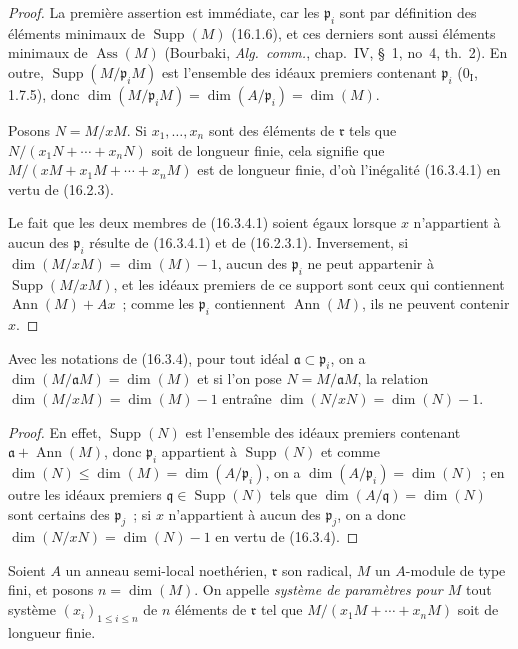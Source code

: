 \begin{proof}
La première assertion est immédiate, car les $\mathfrak{p}_i$ sont par
définition des éléments minimaux de $\operatorname{Supp}(M)$ (16.1.6), et ces
derniers sont aussi éléments minimaux de $\operatorname{Ass}(M)$ (Bourbaki,
\emph{Alg.~comm.}, chap.~IV, \S~1, no~4, th.~2). En outre,
$\operatorname{Supp}(M/\mathfrak{p}_iM)$ est l'ensemble des idéaux premiers
contenant $\mathfrak{p}_i$ ($0_{\mathrm I}$, 1.7.5), donc
$\dim(M/\mathfrak{p}_iM)=\dim(A/\mathfrak{p}_i)=\dim(M)$.

Posons $N=M/xM$. Si $x_1,\ldots,x_n$ sont des éléments de $\mathfrak{r}$ tels
que $N/(x_1N+\cdots+x_nN)$ soit de longueur finie, cela signifie que
$M/(xM+x_1M+\cdots+x_nM)$ est de longueur finie, d'où l'inégalité (16.3.4.1)
en vertu de (16.2.3).

Le fait que les deux membres de (16.3.4.1) soient égaux lorsque $x$
n'appartient à aucun des $\mathfrak{p}_i$ résulte de (16.3.4.1) et de
(16.2.3.1). Inversement, si
$\dim(M/xM)=\dim(M)-1$, aucun des $\mathfrak{p}_i$ ne peut appartenir à
$\operatorname{Supp}(M/xM)$, et les idéaux premiers de ce support sont ceux
qui contiennent $\operatorname{Ann}(M)+Ax$~; comme les $\mathfrak{p}_i$
contiennent $\operatorname{Ann}(M)$, ils ne peuvent contenir $x$.
\end{proof}

\begin{corollary}[16.3.5]
\label{0.16.3.5-fr}
Avec les notations de (16.3.4), pour tout idéal
$\mathfrak{a}\subset\mathfrak{p}_i$, on a
$\dim(M/\mathfrak{a}M)=\dim(M)$ et si l'on pose
$N=M/\mathfrak{a}M$, la relation $\dim(M/xM)=\dim(M)-1$ entraîne
$\dim(N/xN)=\dim(N)-1$.
\end{corollary}

\begin{proof}
En effet, $\operatorname{Supp}(N)$ est l'ensemble des idéaux premiers
contenant $\mathfrak{a}+\operatorname{Ann}(M)$, donc $\mathfrak{p}_i$
appartient à $\operatorname{Supp}(N)$ et comme
$\dim(N)\leq\dim(M)=\dim(A/\mathfrak{p}_i)$, on a
$\dim(A/\mathfrak{p}_i)=\dim(N)$~; en outre les idéaux premiers
$\mathfrak{q}\in\operatorname{Supp}(N)$ tels que
$\dim(A/\mathfrak{q})=\dim(N)$ sont certains des $\mathfrak{p}_j$~; si $x$
n'appartient à aucun des $\mathfrak{p}_j$, on a donc
$\dim(N/xN)=\dim(N)-1$ en vertu de (16.3.4).
\end{proof}

\begin{definition}[16.3.6]
\label{0.16.3.6-fr}
Soient $A$ un anneau semi-local noethérien, $\mathfrak{r}$ son radical, $M$ un
$A$-module de type fini, et posons $n=\dim(M)$. On appelle \emph{système de
paramètres pour $M$} tout système $(x_i)_{1\leq i\leq n}$ de $n$ éléments de
$\mathfrak{r}$ tel que $M/(x_1M+\cdots+x_nM)$ soit de longueur finie.
\end{definition}

